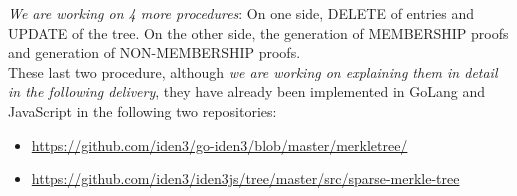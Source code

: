 \documentclass[11pt]{article}
\begin{document}
%
%
%
%
%



%

\newpage
{\it We are working on 4 more procedures}: On one side, DELETE of entries and UPDATE of the tree. On the other side, the generation of MEMBERSHIP proofs and generation of NON-MEMBERSHIP proofs. \\

These last two procedure, although {\it we are working on explaining them in detail in the following delivery}, they have already been implemented in GoLang and JavaScript in the following two repositories:
\begin{itemize}
	\item \url{https://github.com/iden3/go-iden3/blob/master/merkletree/}
	\item \url{https://github.com/iden3/iden3js/tree/master/src/sparse-merkle-tree}
\end{itemize}
\end{document}
